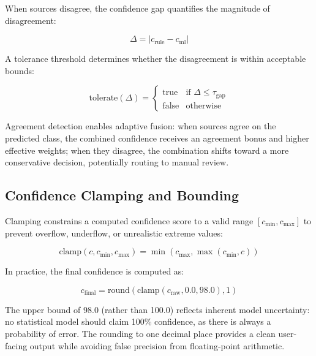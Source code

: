 \documentclass[10pt,a4paper]{article}
\begin{document}
When sources disagree, the confidence gap quantifies the magnitude of disagreement:

\begin{equation}
\Delta = |c_{\text{rule}} - c_{\text{ml}}|
\label{eq:confidence-gap}
\end{equation}

A tolerance threshold determines whether the disagreement is within acceptable bounds:

\begin{equation}
\text{tolerate}(\Delta) = \begin{cases} \text{true} & \text{if } \Delta \leq \tau_{\text{gap}} \\ \text{false} & \text{otherwise} \end{cases}
\label{eq:disagreement-tolerance}
\end{equation}

Agreement detection enables adaptive fusion: when sources agree on the predicted class, the combined confidence receives an agreement bonus and higher effective weights; when they disagree, the combination shifts toward a more conservative decision, potentially routing to manual review.

\subsection{Confidence Clamping and Bounding}
\label{sec:confidence-clamping}

Clamping constrains a computed confidence score to a valid range $[c_{\min}, c_{\max}]$ to prevent overflow, underflow, or unrealistic extreme values:

\begin{equation}
\text{clamp}(c, c_{\min}, c_{\max}) = \min(c_{\max}, \max(c_{\min}, c))
\label{eq:clamp}
\end{equation}

In practice, the final confidence is computed as:

\begin{equation}
c_{\text{final}} = \text{round}(\text{clamp}(c_{\text{raw}}, 0.0, 98.0), 1)
\label{eq:final-confidence}
\end{equation}

The upper bound of 98.0 (rather than 100.0) reflects inherent model uncertainty: no statistical model should claim 100\% confidence, as there is always a probability of error. The rounding to one decimal place provides a clean user-facing output while avoiding false precision from floating-point arithmetic.
\end{document}
